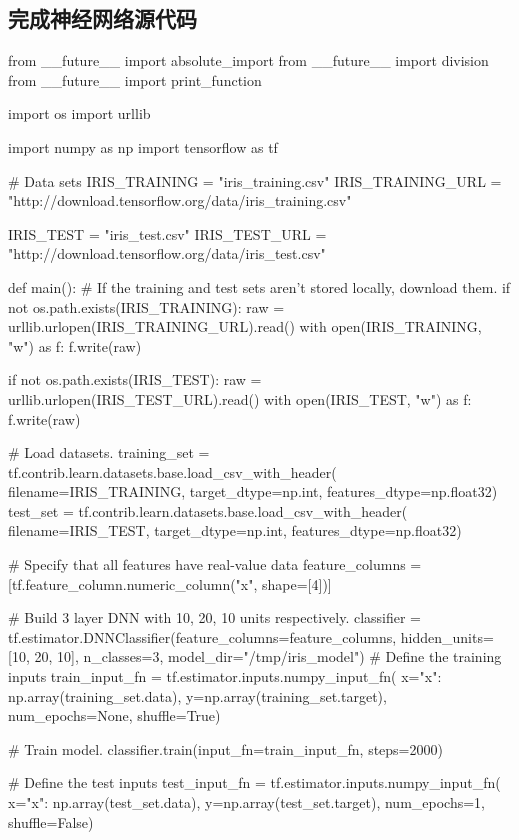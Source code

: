 \subsection{完成神经网络源代码}
\begin{python}
from __future__ import absolute_import
from __future__ import division
from __future__ import print_function

import os
import urllib

import numpy as np
import tensorflow as tf

# Data sets
IRIS_TRAINING = "iris_training.csv"
IRIS_TRAINING_URL = "http://download.tensorflow.org/data/iris_training.csv"

IRIS_TEST = "iris_test.csv"
IRIS_TEST_URL = "http://download.tensorflow.org/data/iris_test.csv"

def main():
  # If the training and test sets aren't stored locally, download them.
  if not os.path.exists(IRIS_TRAINING):
    raw = urllib.urlopen(IRIS_TRAINING_URL).read()
    with open(IRIS_TRAINING, "w") as f:
      f.write(raw)

  if not os.path.exists(IRIS_TEST):
    raw = urllib.urlopen(IRIS_TEST_URL).read()
    with open(IRIS_TEST, "w") as f:
      f.write(raw)

  # Load datasets.
  training_set = tf.contrib.learn.datasets.base.load_csv_with_header(
      filename=IRIS_TRAINING,
      target_dtype=np.int,
      features_dtype=np.float32)
  test_set = tf.contrib.learn.datasets.base.load_csv_with_header(
      filename=IRIS_TEST,
      target_dtype=np.int,
      features_dtype=np.float32)

  # Specify that all features have real-value data
  feature_columns = [tf.feature_column.numeric_column("x", shape=[4])]

  # Build 3 layer DNN with 10, 20, 10 units respectively.
  classifier = tf.estimator.DNNClassifier(feature_columns=feature_columns,
                                          hidden_units=[10, 20, 10],
                                          n_classes=3,
                                          model_dir="/tmp/iris_model")
  # Define the training inputs
  train_input_fn = tf.estimator.inputs.numpy_input_fn(
      x={"x": np.array(training_set.data)},
      y=np.array(training_set.target),
      num_epochs=None,
      shuffle=True)

  # Train model.
  classifier.train(input_fn=train_input_fn, steps=2000)

  # Define the test inputs
  test_input_fn = tf.estimator.inputs.numpy_input_fn(
      x={"x": np.array(test_set.data)},
      y=np.array(test_set.target),
      num_epochs=1,
      shuffle=False)


\end{python}
